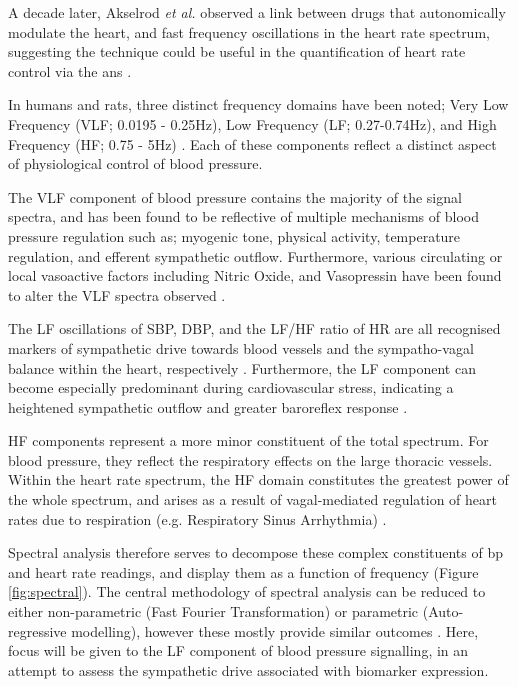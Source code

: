 A decade later, Akselrod \textit{et al.} observed a link between drugs that autonomically modulate the heart, and fast frequency oscillations in the heart rate spectrum, suggesting the technique could be useful in the quantification of heart rate control via the \acrfull{ans} \cite{Akselrod1981}. 

In humans and rats, three distinct frequency domains have been noted; Very Low Frequency (VLF; 0.0195 - 0.25Hz), Low Frequency (LF; 0.27-0.74Hz), and High Frequency (HF; 0.75 - 5Hz) \cite{doi:10.3109/10641969809053219}. Each of these components reflect a distinct aspect of physiological control of blood pressure. 

The VLF component of blood pressure contains the majority of the signal spectra, and has been found to be reflective of multiple mechanisms of blood pressure regulation such as; myogenic tone, physical activity, temperature regulation, and efferent sympathetic outflow. Furthermore, various circulating or local vasoactive factors including Nitric Oxide, and Vasopressin have been found to alter the VLF spectra observed \cite{Japundzic-Zigon2002,Milutinovic2006,Tasic2017}.

The LF oscillations of SBP, DBP, and the LF/HF ratio of HR are all recognised markers of sympathetic drive towards blood vessels and the sympatho-vagal balance within the heart, respectively \cite{Sarenac2011,taskforce,Parati1995}. Furthermore, the LF component can become especially predominant during cardiovascular stress, indicating a heightened sympathetic outflow and greater baroreflex response \cite{Japundzic-Zigon2002}. 

HF components represent a more minor constituent of the total spectrum. For blood pressure, they reflect the respiratory effects on the large thoracic vessels. Within the heart rate spectrum, the HF domain constitutes the greatest power of the whole spectrum, and arises as a result of vagal-mediated regulation of heart rates due to respiration (e.g. Respiratory Sinus Arrhythmia) \cite{Japundzic-Zigon2002,doi:10.3109/10641969809053219}.

Spectral analysis therefore serves to decompose these complex constituents of \acrshort{bp} and heart rate readings, and display them as a function of frequency (Figure \ref{fig:spectral}). The central methodology of spectral analysis can be reduced to either non-parametric (Fast Fourier Transformation) or parametric (Auto-regressive modelling), however these mostly provide similar outcomes \cite{doi:10.3109/10641969809053219}. Here, focus will be given to the LF component of blood pressure signalling, in an attempt to assess the sympathetic drive associated with biomarker expression.

